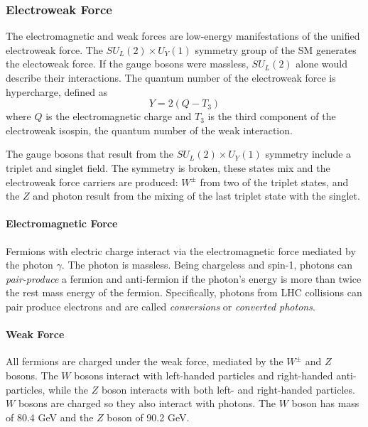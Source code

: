 \subsubsection{Electroweak Force}
The electromagnetic and weak forces are low-energy manifestations of the unified electroweak force. The $SU_{L}(2) \times U_{Y}(1)$ symmetry group of the \ac{SM} generates the electoweak force. If the gauge bosons were massless, $SU_{L}(2)$ alone would describe their interactions. The quantum number of the electroweak force is hypercharge, defined as
\begin{equation}
Y=2(Q-T_{3})
\end{equation}
where $Q$ is the electromagnetic charge and $T_3$ is the third component of the electroweak isospin, the quantum number of the weak interaction.

The gauge bosons that result from the $SU_{L}(2) \times U_{Y}(1)$ symmetry include a triplet and singlet field. The symmetry is broken, these states mix and the electroweak force carriers are produced: $W^{\pm}$ from two of the triplet states, and the $Z$ and photon result from the mixing of the last triplet state with the singlet.

\paragraph{Electromagnetic Force}

Fermions with electric charge interact via the electromagnetic force mediated by the photon $\gamma$. The photon is massless. Being chargeless and spin-1, photons can \emph{pair-produce} a fermion and anti-fermion if the photon's energy is more than twice the rest mass energy of the fermion. Specifically, photons from \ac{LHC} collisions can pair produce electrons and are called \emph{conversions} or \emph{converted photons}.

\paragraph{Weak Force}
All fermions are charged under the weak force, mediated by the $W^{\pm}$ and $Z$ bosons. The $W$ bosons interact with left-handed particles and right-handed anti-particles, while the $Z$ boson interacts with both left- and right-handed particles. $W$ bosons are charged so they also interact with photons. The $W$ boson has mass of 80.4 GeV and the $Z$ boson of 90.2 GeV. 

